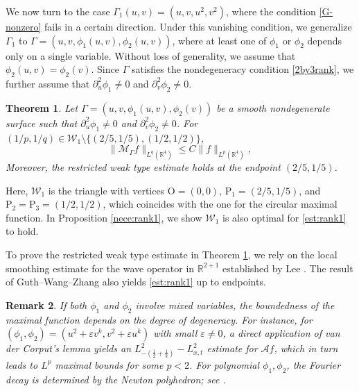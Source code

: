 \documentclass[10pt] %
{amsart}
\theoremstyle{plain}
\newtheorem{thm}{Theorem}[section]
\newtheorem{rmk}[thm]{Remark}
\numberwithin{equation}{section}
\begin{document}
 
 
 
 \bigskip 


We now turn to the case $\Gamma_1(u,v) = (u,v,u^2,v^2)$, where the condition  \eqref{G-nonzero} fails in a certain direction.  
Under this vanishing condition, we generalize $\Gamma_1$  to $\Gamma= (u,v,\phi_1(u,v), \phi_2(u,v))$, where at least one of $\phi_1$ or $\phi_2$ depends only on a single variable.  Without loss of generality, we assume that $\phi_2(u,v) = \phi_2(v)$. 
Since $\Gamma$ satisfies the nondegeneracy condition \eqref{2by3rank}, we further assume that  $\partial_u^2\phi_1\neq 0$ and $\partial_v^2\phi_2\neq0$.


  
\begin{thm}\label{thm:rank1}
Let $\Gamma=(u,v,\phi_1(u,v),\phi_2(v))$ be a smooth nondegenerate surface such that $\partial_u^2\phi_1\neq 0$ and $\partial_v^2\phi_2\neq0$.
For $(1/p,1/q)\in \mathcal  W_1 \setminus \big\{ ( 2/5,1/5), (1/2,1/2)\big\}$, 
\begin{equation}\label{est:rank1}
\big\| \mathcal M_\Gamma f\big\|_{L^q(\mathbb R^{4})} \le  C\|f\|_{L^p(\mathbb R^{4})}, 
\end{equation}
Moreover, the restricted weak type estimate holds at the endpoint $( 2/5,1/5)$.
\end{thm}


 
Here, $\mathcal W_1$ is the triangle with vertices $\mathrm O = (0,0)$, $\mathrm P_1=(2/5,1/5)$, and $\mathrm P_2=\mathrm P_3=(1/2,1/2)$, which coincides with the one for the circular maximal function.
In Proposition \ref{nece:rank1}, we show $\mathcal W_1$ is also optimal for \eqref{est:rank1} to hold. 

To prove the restricted weak type estimate in Theorem \ref{thm:rank1}, we rely on the local smoothing estimate for the wave operator in $\mathbb R^{2+1}$ established by Lee \cite{Lee}. 
The result of Guth--Wang--Zhang \cite{GWZ} also yields \eqref{est:rank1} up to endpoints. 
 

\begin{rmk}\label{rmk:rank1} 
If both $\phi_1$ and $\phi_2$ involve mixed variables, the boundedness of the maximal function   depends on the degree of degeneracy.  
For instance, for  $(\phi_1,\phi_2)=(u^2 + \varepsilon v^k ,v^2 + \varepsilon u^k)$ with small $\varepsilon \neq 0$, a direct application of van der Corput's lemma yields an $L_{-(\frac 1 2+\frac 1k)}^2-L_{x,t}^2$ estimate for $\mathcal Af$, which in turn leads to $L^p$ maximal bounds for some $p<2$.
For polynomial $\phi_1,\phi_2$, the Fourier decay is determined by the Newton polyhedron; see \cite{Ba02}.
\end{rmk}
\end{document}
